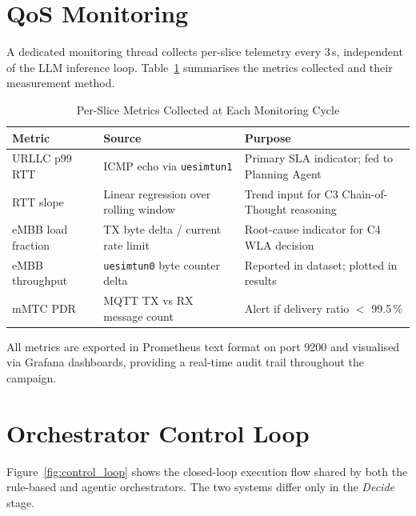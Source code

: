 \section{QoS Monitoring}

A dedicated monitoring thread collects per-slice telemetry every 3\,s,
independent of the LLM inference loop. Table~\ref{tab:metrics} summarises the
metrics collected and their measurement method.

\begin{table}[H]
\centering
\caption{Per-Slice Metrics Collected at Each Monitoring Cycle}
\label{tab:metrics}
\begin{tabular}{p{2.8cm}p{4.2cm}p{5.8cm}}
\toprule
\textbf{Metric} & \textbf{Source} & \textbf{Purpose} \\
\midrule
URLLC p99 RTT & ICMP echo via \texttt{uesimtun1} & Primary SLA indicator; fed to Planning Agent \\
RTT slope     & Linear regression over rolling window & Trend input for C3 Chain-of-Thought reasoning \\
eMBB load fraction & TX byte delta / current rate limit & Root-cause indicator for C4 WLA decision \\
eMBB throughput & \texttt{uesimtun0} byte counter delta & Reported in dataset; plotted in results \\
mMTC PDR      & MQTT TX vs RX message count & Alert if delivery ratio $<$ 99.5\,\% \\
\bottomrule
\end{tabular}
\end{table}

All metrics are exported in Prometheus text format on port 9200 and visualised
via Grafana dashboards, providing a real-time audit trail throughout the campaign.

\section{Orchestrator Control Loop}

Figure~\ref{fig:control_loop} shows the closed-loop execution flow shared by
both the rule-based and agentic orchestrators. The two systems differ only in
the \textit{Decide} stage.

